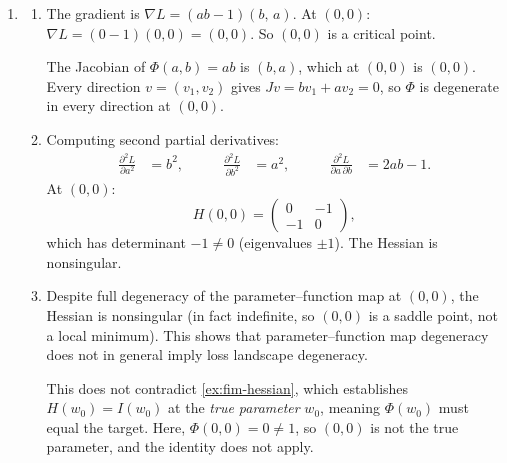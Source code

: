 \documentclass[11pt]{article}
\begin{document}
\begin{solution}
\begin{enumerate}
    \item
    \begin{enumerate}
        \item
            The gradient is
            $\nabla L = (ab - 1)(b,\, a)$.
            At $(0, 0)$: $\nabla L = (0 - 1)(0, 0) = (0, 0)$.
            So $(0, 0)$ is a critical point.

            The Jacobian of $\Phi(a,b) = ab$ is $(b, a)$, which at
            $(0, 0)$ is $(0, 0)$. Every direction $v = (v_1, v_2)$ gives
            $J v = b v_1 + a v_2 = 0$, so $\Phi$ is degenerate in every
            direction at $(0, 0)$.

        \item
            Computing second partial derivatives:
            \begin{align*}
                \frac{\partial^2 L}{\partial a^2} &= b^2,
            &\qquad
                \frac{\partial^2 L}{\partial b^2} &= a^2,
            &\qquad
                \frac{\partial^2 L}{\partial a\, \partial b}
                &= 2ab - 1.
            \end{align*}
            At $(0, 0)$:
            \begin{equation*}
                H(0,0) = \begin{pmatrix} 0 & -1 \\ -1 & 0 \end{pmatrix},
            \end{equation*}
            which has determinant $-1 \neq 0$ (eigenvalues $\pm 1$).
            The Hessian is nonsingular.

        \item
            Despite full degeneracy of the parameter--function map at $(0,0)$,
            the Hessian is nonsingular (in fact indefinite, so $(0,0)$ is a
            saddle point, not a local minimum). This shows that
            parameter--function map degeneracy does not in general imply loss
            landscape degeneracy.

            This does not contradict \cref{ex:fim-hessian}, which establishes
            $H(w_0) = I(w_0)$ at the \emph{true parameter} $w_0$, meaning
            $\Phi(w_0)$ must equal the target. Here, $\Phi(0,0) = 0 \neq 1$,
            so $(0,0)$ is not the true parameter, and the identity does not
            apply. \qedhere
    \end{enumerate}
\end{enumerate}
\end{solution}
\end{document}
